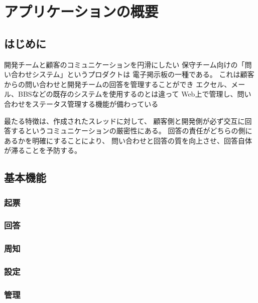\chapter{アプリケーションの概要}
    
    \section{はじめに}

        開発チームと顧客のコミュニケーションを円滑にしたい
        保守チーム向けの「問い合わせシステム」というプロダクトは
        電子掲示板の一種である。
        これは顧客からの問い合わせと開発チームの回答を管理することができ
        エクセル、メール、BBSなどの既存のシステムを使用するのとは違って
        Web上で管理し、問い合わせをステータス管理する機能が備わっている

        最たる特徴は、作成されたスレッドに対して、
        顧客側と開発側が必ず交互に回答するというコミュニケーションの厳密性にある。
        回答の責任がどちらの側にあるかを明確にすることにより、
        問い合わせと回答の質を向上させ、回答自体が滞ることを予防する。

    \section{基本機能}

        \subsection{起票}
        \subsection{回答}
        \subsection{周知}
        \subsection{設定}
        \subsection{管理}


